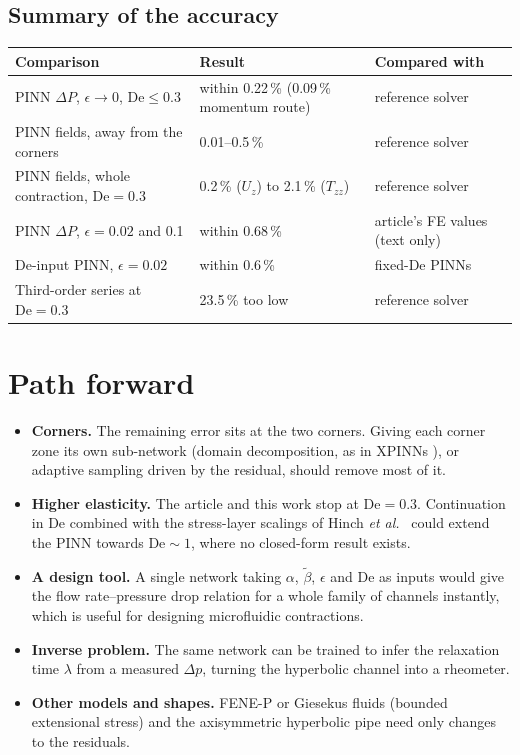 \documentclass[11pt,a4paper]{article}
\newcommand{\De}{\mathrm{De}}
\newcommand{\bt}{\tilde\beta}
\begin{document}
\subsection{Summary of the accuracy}
\begin{center}\footnotesize
\begin{tabular}{@{}lll@{}}
\toprule
Comparison & Result & Compared with\\
\midrule
PINN $\Delta P$, $\epsilon\to0$, $\De\le0.3$ & within 0.22\,\% (0.09\,\% momentum route) & reference solver\\
PINN fields, away from the corners & 0.01--0.5\,\% & reference solver\\
PINN fields, whole contraction, $\De=0.3$ & 0.2\,\% ($U_z$) to 2.1\,\% ($T_{zz}$) & reference solver\\
PINN $\Delta P$, $\epsilon=0.02$ and 0.1 & within 0.68\,\% & article's FE values (text only)\\
$\De$-input PINN, $\epsilon=0.02$ & within 0.6\,\% & fixed-$\De$ PINNs\\
Third-order series at $\De=0.3$ & 23.5\,\% too low & reference solver\\
\bottomrule
\end{tabular}
\end{center}

\section{Path forward}
\begin{itemize}
\item \textbf{Corners.} The remaining error sits at the two corners. Giving each corner zone its own sub-network (domain decomposition, as in XPINNs \cite{jagtap2020}), or adaptive sampling driven by the residual, should remove most of it.
\item \textbf{Higher elasticity.} The article and this work stop at $\De=0.3$. Continuation in $\De$ combined with the stress-layer scalings of Hinch \emph{et al.}\ \cite{hinch2024} could extend the PINN towards $\De\sim1$, where no closed-form result exists.
\item \textbf{A design tool.} A single network taking $\alpha$, $\bt$, $\epsilon$ and $\De$ as inputs would give the flow rate--pressure drop relation for a whole family of channels instantly, which is useful for designing microfluidic contractions.
\item \textbf{Inverse problem.} The same network can be trained to infer the relaxation time $\lambda$ from a measured $\Delta p$, turning the hyperbolic channel into a rheometer.
\item \textbf{Other models and shapes.} FENE-P or Giesekus fluids (bounded extensional stress) and the axisymmetric hyperbolic pipe \cite{housiadas2024} need only changes to the residuals.
\end{itemize}
\end{document}
